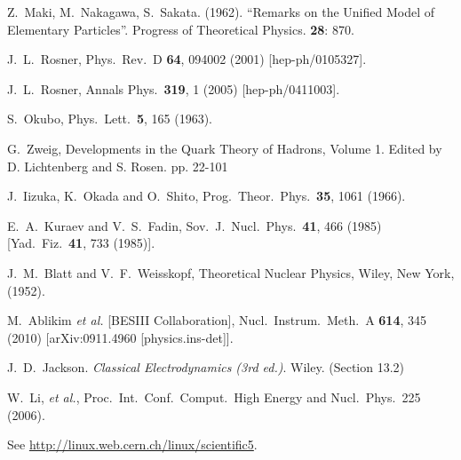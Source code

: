 \begin{thebibliography}{99}
  Z.~Maki, M.~Nakagawa, S.~Sakata. (1962).
  ``Remarks on the Unified Model of Elementary Particles''.
  Progress of Theoretical Physics. {\bf 28}: 870.

  J.~L.~Rosner,
  Phys.\ Rev.\ D {\bf 64}, 094002 (2001)
  [hep-ph/0105327].

  J.~L.~Rosner,
  Annals Phys.\  {\bf 319}, 1 (2005)
  [hep-ph/0411003].

  S.~Okubo,
  Phys.\ Lett.\  {\bf 5}, 165 (1963).

  G.~Zweig,
  Developments in the Quark Theory of Hadrons, Volume 1. Edited by D. Lichtenberg and S. Rosen. pp. 22-101

  J.~Iizuka, K.~Okada and O.~Shito,
  Prog.\ Theor.\ Phys.\  {\bf 35}, 1061 (1966).

  E.~A.~Kuraev and V.~S.~Fadin,
  Sov.\ J.\ Nucl.\ Phys.\  {\bf 41}, 466 (1985)
  [Yad.\ Fiz.\  {\bf 41}, 733 (1985)].

  J.~M.~Blatt and V.~F.~Weisskopf,
  Theoretical Nuclear Physics, Wiley, New York, (1952).



  M.~Ablikim {\it et al.}  [BESIII Collaboration],
  Nucl.\ Instrum.\ Meth.\ A {\bf 614}, 345 (2010)
  [arXiv:0911.4960 [physics.ins-det]].

  J.~D.~Jackson.
  {\it Classical Electrodynamics (3rd ed.)}.
  Wiley. (Section 13.2)
 
  W.~Li, {\it et al.},
  Proc.\ Int.\ Conf.\ Comput.\ High Energy and Nucl.\ Phys.\ 225 (2006).

  See \url{http://linux.web.cern.ch/linux/scientific5}.


\end{thebibliography}
